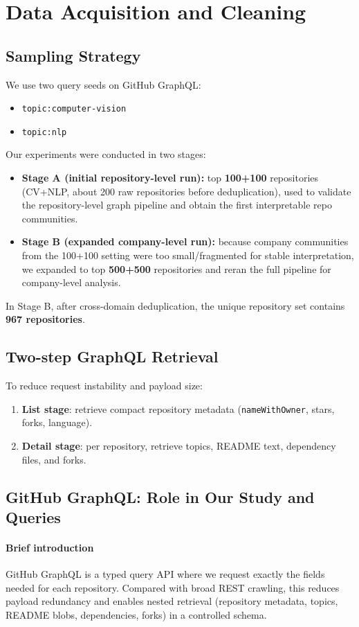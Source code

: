 \documentclass[11pt]{article}
\begin{document}
\section{Data Acquisition and Cleaning}
\subsection{Sampling Strategy}
We use two query seeds on GitHub GraphQL:
\begin{itemize}[leftmargin=1.5em]
    \item \texttt{topic:computer-vision}
    \item \texttt{topic:nlp}
\end{itemize}
Our experiments were conducted in two stages:
\begin{itemize}[leftmargin=1.5em]
    \item \textbf{Stage A (initial repository-level run):} top \textbf{100+100} repositories (CV+NLP, about 200 raw repositories before deduplication), used to validate the repository-level graph pipeline and obtain the first interpretable repo communities.
    \item \textbf{Stage B (expanded company-level run):} because company communities from the 100+100 setting were too small/fragmented for stable interpretation, we expanded to top \textbf{500+500} repositories and reran the full pipeline for company-level analysis.
\end{itemize}
In Stage B, after cross-domain deduplication, the unique repository set contains \textbf{967 repositories}.

\subsection{Two-step GraphQL Retrieval}
To reduce request instability and payload size:
\begin{enumerate}[leftmargin=1.5em]
    \item \textbf{List stage}: retrieve compact repository metadata (\texttt{nameWithOwner}, stars, forks, language).
    \item \textbf{Detail stage}: per repository, retrieve topics, README text, dependency files, and forks.
\end{enumerate}

\subsection{GitHub GraphQL: Role in Our Study and Queries}
\paragraph{Brief introduction}
GitHub GraphQL is a typed query API where we request exactly the fields needed for each repository.
Compared with broad REST crawling, this reduces payload redundancy and enables nested retrieval (repository metadata, topics, README blobs, dependencies, forks) in a controlled schema.
\end{document}
